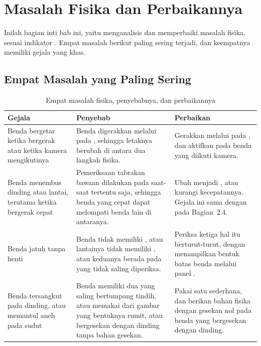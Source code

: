 \section{Masalah Fisika dan Perbaikannya}
\label{sec:masalah-fisika}

Inilah bagian inti bab ini, yaitu menganalisis dan memperbaiki masalah fisika,
sesuai indikator . Empat masalah berikut paling sering terjadi, dan
keempatnya memiliki gejala yang khas.

\subsection{Empat Masalah yang Paling Sering}

\begin{table}[htbp]
\centering
\caption{Empat masalah fisika, penyebabnya, dan perbaikannya}
\label{tab:masalah-fisika}
{\setlength{\tabcolsep}{4pt}\footnotesize%
\begin{tabularx}{\textwidth}{@{}L{2.8cm} L{4.2cm} Y@{}}
\toprule
\headrow \textbf{Gejala} & \textbf{Penyebab} & \textbf{Perbaikan} \\
\midrule
Benda bergetar ketika bergerak atau ketika kamera mengikutinya &
Benda digerakkan melalui  pada ,
sehingga letaknya berubah di antara dua langkah fisika. &
Gerakkan melalui  pada , dan aktifkan
 pada benda yang diikuti kamera. \\
\addlinespace
Benda menembus dinding atau lantai, terutama ketika bergerak cepat &
Pemeriksaan tabrakan bawaan dilakukan pada saat-saat tertentu saja, sehingga
benda yang cepat dapat melompati benda lain di antaranya. &
Ubah  menjadi , atau
kurangi kecepatannya. Gejala ini sama dengan  pada
Bagian~2.4. \\
\addlinespace
Benda jatuh tanpa henti &
Benda tidak memiliki , atau lantainya tidak memiliki
, atau keduanya berada pada  yang tidak
saling diperiksa. &
Periksa ketiga hal itu berturut-turut, dengan menampilkan bentuk batas benda
melalui panel . \\
\addlinespace
Benda tersangkut pada dinding, atau memantul aneh pada sudut &
Benda memiliki dua  yang saling bertumpang tindih, atau
memakai  dari gambar yang bentuknya rumit, atau bergesekan
dengan dinding tanpa bahan gesekan. &
Pakai satu  sederhana, dan berikan bahan fisika dengan
gesekan nol pada benda yang bergesekan dengan dinding. \\
\bottomrule
\end{tabularx}}
\end{table}

